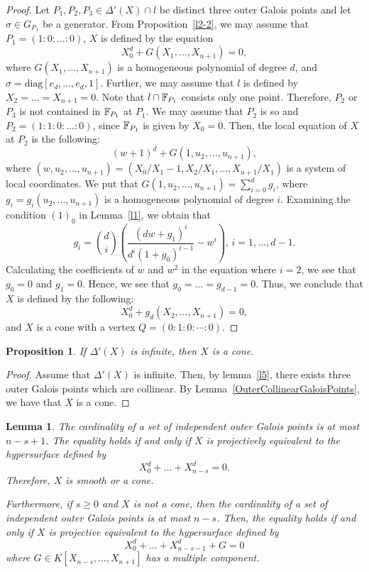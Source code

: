 \documentclass[10pt,oneside]{amsart}
\newtheorem{proposition}{Proposition}
\newtheorem{lemma}{Lemma}
\theoremstyle{definition}
\begin{document}
\begin{proof}
Let $P_1, P_2, P_3 \in \Delta'(X) \cap l$ be distinct three outer Galois points and let $\sigma \in G_{P_1}$ be a generator. 
From Proposition~\ref{l2-2}, we may assume that $P_1=(1:0:\dots:0)$, $X$ is defined by the equation 
$$X_{0}^d+G(X_1,\dots,X_{n+1})=0,$$
where $G(X_1,\dots,X_{n+1})$ is a homogeneous polynomial of degree $d$, 
and $\sigma=\mathrm{diag}[e_d, \dots, e_d, 1]$. Further, we may assume that $l$ is defined by $X_2 = \dots =X_{n+1}=0$. 
Note that $l \cap \Bbb F_{P_1}$ consists only one point. 
Therefore, $P_2$ or $P_3$ is not contained in $\Bbb F_{P_1}$ at $P_1$. 
We may assume that $P_2$ is so and $P_2=(1:1:0:\dots:0)$, since $\Bbb F_{P_1}$ is given by $X_{0}=0$. 
Then, the local equation of $X$ at $P_2$ is the following: 
$$(w+1)^d+G(1, u_2,\dots,u_{n+1}),$$
where $(w, u_2,\dots,u_{n+1})=(X_0/X_1-1, X_2/X_1, \dots, X_{n+1}/X_1)$ is a system of local coordinates. 
We put that $G(1, u_2,\dots,u_{n+1})=\sum_{i=0}^d g_i$, where $g_i=g_i(u_2,\dots,u_{n+1})$ is a homogeneous polynomial of degree $i$. 
Examining the condition $(1)_0$ in Lemma~\ref{l1}, we obtain that 
$$g_i= \binom{d}{i} \left( \frac{(dw+g_1)^i}{d^i(1+g_0)^{i-1}} - w^i \right), \, i=1,\dots, d-1. $$
Calculating the coefficients of $w$ and $w^2$ in the equation where $i=2$, we see that $g_0=0$ and $g_1=0$. Hence, we see that $g_0=\dots=g_{d-1}=0$. 
Thus, we conclude that $X$ is defined by the following: 
$$X_{0}^d+g_d(X_2,\dots,X_{n+1})=0,$$
and $X$ is a cone with a vertex $Q=(0:1:0:\cdots:0)$. 
\end{proof} 

\begin{proposition} \label{Infinite3} 
If $\Delta'(X)$ is infinite, then $X$ is a cone. 
\end{proposition}

\begin{proof}
Assume that $\Delta'(X)$ is infinite. Then, by lemma~\ref{l5}, there exists three outer Galois points which are collinear. By Lemma~\ref{OuterCollinearGaloisPoints}, we have that $X$ is a cone. 
\end{proof} 

\begin{lemma}  \label{IndependentOuter} 
The cardinality of a set of independent outer Galois points is at most $n-s+1$.  
The equality holds if and only if $X$ is projectively equivalent to the hypersurface defined by 
$$ X_0^d+\dots+X_{n-s}^d=0.  $$
Therefore, $X$ is smooth or a cone. 

Furthermore, if $s \ge 0$ and $X$ is not a cone, then the cardinality of a set of independent outer Galois points is at most $n-s$. 
Then, the equality holds if and only if $X$ is projective equivalent to the hypersurface defined by 
$$ X_0^d+\dots+X_{n-s-1}^d+G=0 $$
where $G \in K[X_{n-s}, \ldots, X_{n+1}]$ has a multiple component. 
\end{lemma}
\end{document}

